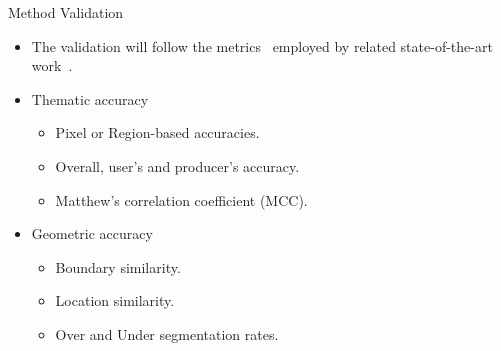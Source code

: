 \documentclass[xcolor=table]{beamer}
\begin{document}
\begin{frame}{Method Validation}

	\begin{itemize}
		\item The validation will follow the metrics~\cite{sokolova2009} employed by related state-of-the-art work~\cite{waldner2021}.
	\end{itemize}		

	\begin{itemize}
	    \item Thematic accuracy
		\begin{itemize}
			\item Pixel or Region-based accuracies.
			\item Overall, user's and producer's accuracy.
			\item Matthew's correlation coefficient (MCC).
		\end{itemize}
		
		\item Geometric accuracy
		\begin{itemize}
			\item Boundary similarity.
			\item Location similarity.
			\item Over and Under segmentation rates.
		\end{itemize}
	\end{itemize}
		
\end{frame}

\end{document}
